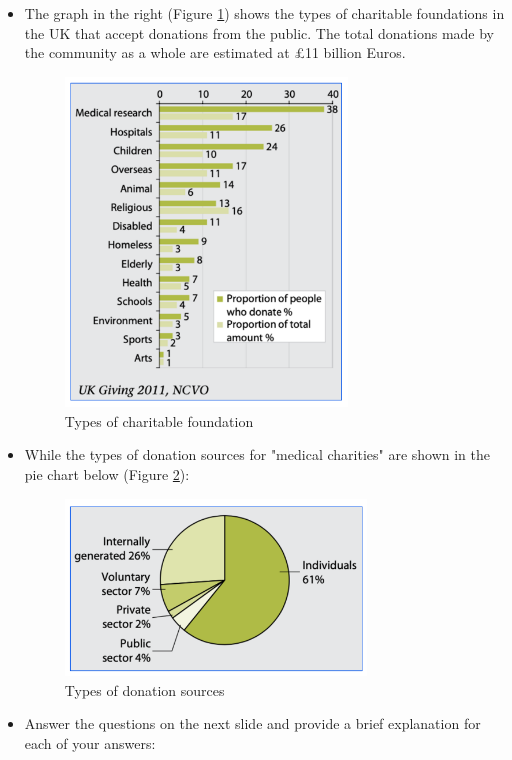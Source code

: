 \documentclass[12pt,titlepage]{article}
\begin{document}
\begin{itemize}
{        To be in profit, they need to sell each pot ranging from \$20.1 to \$24.1. The \$0.1 is added because each pot has a production cost of \$0.1
        and its profit need to be at least \$20 to \$24 to reach \$0 to \$20,000 net profit.
    }
    \pagebreak
    \item {
        The graph in the right (Figure \ref{charitable_graph}) shows the types of charitable foundations in the UK that accept donations from the public.
        The total donations made by the community as a whole are estimated at \pounds11 billion Euros.

        \begin{figure}[h]
            \centering
            \includegraphics[width=7.5cm]{images/graph_1.png}
            \caption{Types of charitable foundation}
            \label{charitable_graph}
        \end{figure}
    }
    \item {
        While the types of donation sources for "medical charities" are shown in the pie chart below (Figure \ref{donation_graph}):

        \begin{figure}[h]
            \centering
            \includegraphics[width=8cm]{images/graph_2.png}
            \caption{Types of donation sources}
            \label{donation_graph}
        \end{figure}
    }
    \pagebreak
    \item {
        Answer the questions on the next slide and provide a brief explanation for each of your answers:

}
\end{itemize}
\end{document}
